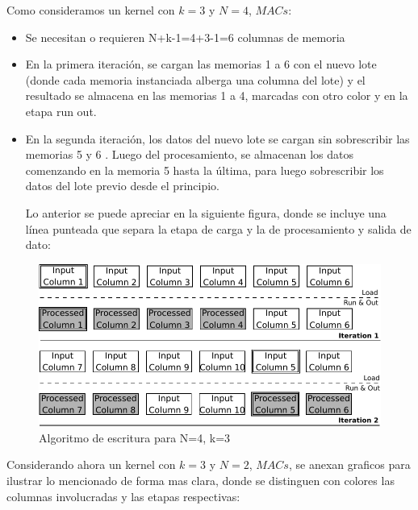 \documentclass[a4paper]{article}
\begin{document}
Como consideramos un kernel con $k=3$ y $N=4$, $MACs$:
\begin{frame}{}
	    
      \begin{itemize}
        \item Se necesitan o requieren N+k-1=4+3-1=6 columnas de memoria
	\item En la primera iteración, se cargan las memorias 1 a 6 con el nuevo lote (donde cada memoria instanciada alberga una columna del lote) y el resultado se almacena en las memorias 1 a 4, marcadas con otro color y en la etapa run  out.
	\item En la segunda iteración, los datos del nuevo lote se cargan sin sobrescribir las memorias 5 y 6 . Luego del procesamiento, se almacenan los datos comenzando en la memoria  5 hasta la última, para luego sobrescribir los datos del lote previo desde el principio.

\bigskip
\bigskip
Lo anterior se puede apreciar en la siguiente figura, donde se incluye una línea punteada que separa la etapa de carga y la de procesamiento y salida de dato:

\end{itemize}
\end{frame}

\begin{figure}[H]
\centering
\includegraphics[scale=0.8]{algorithm}
\caption{Algoritmo de escritura para N=4, k=3 }
\label{writingprocess1}
\end{figure}


\bigskip

Considerando ahora un kernel con $k=3$ y  $N=2$, $MACs$, se anexan graficos para ilustrar lo mencionado de forma mas clara, 
donde se distinguen con colores las columnas involucradas y las etapas respectivas:
\end{document}
